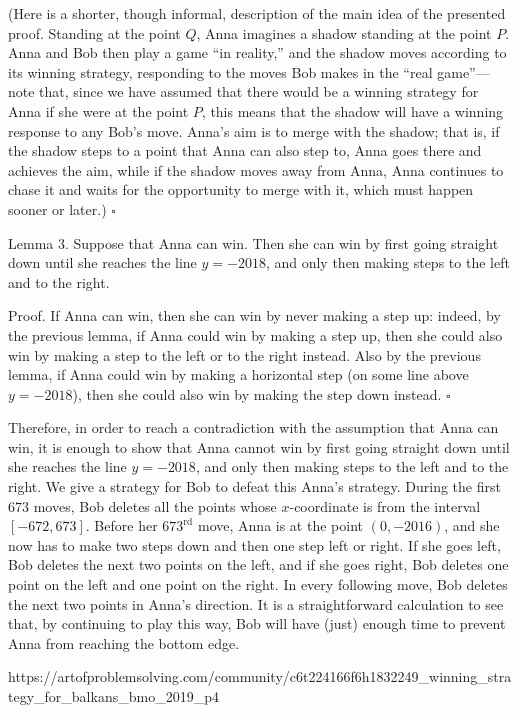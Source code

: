 {    (Here is a shorter, though informal, description of the main idea of the presented proof. Standing at the point $Q$, Anna imagines a shadow standing at the point $P$. Anna and Bob then play a game “in reality,” and the shadow moves according to its winning strategy, responding to the moves Bob makes in the “real game”---note that, since we have assumed that there would be a winning strategy for Anna if she were at the point $P$, this means that the shadow will have a winning response to any Bob's move. Anna's aim is to merge with the shadow; that is, if the shadow steps to a point that Anna can also step to, Anna goes there and achieves the aim, while if the shadow moves away from Anna, Anna continues to chase it and waits for the opportunity to merge with it, which must happen sooner or later.) $\square$

    Lemma 3. Suppose that Anna can win. Then she can win by first going straight down until she reaches the line $y=-2018$, and only then making steps to the left and to the right.

    Proof. If Anna can win, then she can win by never making a step up: indeed, by the previous lemma, if Anna could win by making a step up, then she could also win by making a step to the left or to the right instead. Also by the previous lemma, if Anna could win by making a horizontal step (on some line above $y=-2018$), then she could also win by making the step down instead. $\square$

    Therefore, in order to reach a contradiction with the assumption that Anna can win, it is enough to show that Anna cannot win by first going straight down until she reaches the line $y=-2018$, and only then making steps to the left and to the right. We give a strategy for Bob to defeat this Anna's strategy. During the first $673$ moves, Bob deletes all the points whose $x$-coordinate is from the interval $[-672,673]$. Before her $673^{\text{rd}}$ move, Anna is at the point $(0,-2016)$, and she now has to make two steps down and then one step left or right. If she goes left, Bob deletes the next two points on the left, and if she goes right, Bob deletes one point on the left and one point on the right. In every following move, Bob deletes the next two points in Anna's direction. It is a straightforward calculation to see that, by continuing to play this way, Bob will have (just) enough time to prevent Anna from reaching the bottom edge.
    }{%
    https://artofproblemsolving.com/community/c6t224166f6h1832249_winning_strategy_for_balkans_bmo_2019_p4
}
